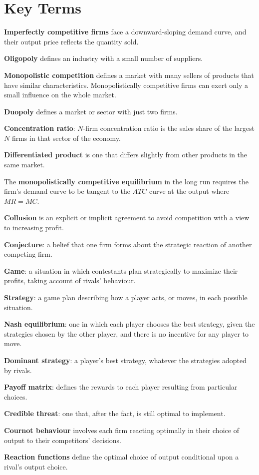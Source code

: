 \newpage
	\section*{Key Terms}
\begin{keyterms}
\textbf{Imperfectly competitive firms} face a downward-sloping demand curve, and their output price reflects the quantity sold.

\textbf{Oligopoly} defines an industry with a small number of suppliers.

\textbf{Monopolistic competition} defines a market with many sellers of products that have similar characteristics. Monopolistically competitive firms can exert only a small influence on the whole market.

\textbf{Duopoly} defines a market or sector with just two firms.

\textbf{Concentration ratio}: $N$-firm concentration ratio is the sales share of the largest $N$ firms in that sector of the economy.

\textbf{Differentiated product} is one that differs slightly from other products in the same market.

The \textbf{monopolistically competitive equilibrium} in the long run requires the firm's demand curve to be tangent to the $ATC$ curve at the output where $MR=MC$.

\textbf{Collusion} is an explicit or implicit agreement to avoid competition with a view to increasing profit.

\textbf{Conjecture}: a belief that one firm forms about the strategic reaction of another competing firm.

\textbf{Game}: a situation in which contestants plan strategically to maximize their profits, taking account of rivals' behaviour.

\textbf{Strategy}: a game plan describing how a player acts, or moves, in each possible situation.

\textbf{Nash equilibrium}: one in which each player chooses the best strategy, given the strategies chosen by the other player, and there is no incentive for any player to move.

\textbf{Dominant strategy}: a player's best strategy, whatever the strategies adopted by rivals.

\textbf{Payoff matrix}: defines the rewards to each player resulting from particular choices.

\textbf{Credible threat}: one that, after the fact, is still optimal to implement.

\textbf{Cournot behaviour} involves each firm reacting optimally in their choice of output to their competitors' decisions.

\textbf{Reaction functions} define the optimal choice of output conditional upon a rival's output choice.
\end{keyterms}